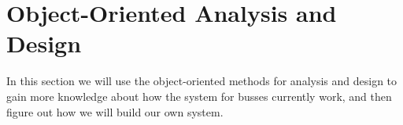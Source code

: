 \section{Object-Oriented Analysis and Design}
In this section we will use the object-oriented methods for analysis and design to gain more knowledge about how the system for busses currently work, and then figure out how we will build our own system.
